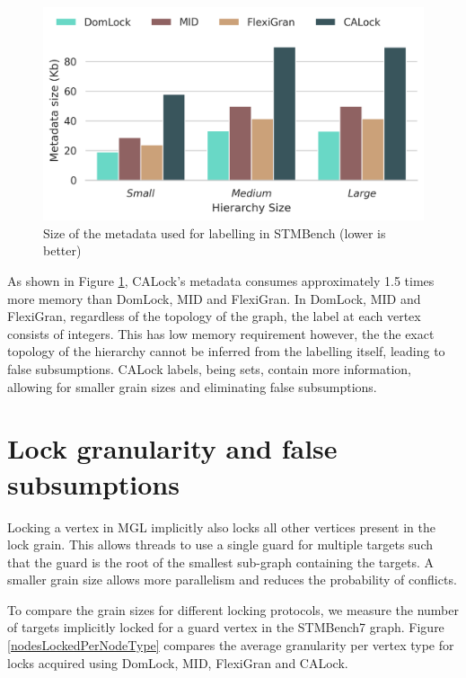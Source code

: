 \begin{figure}[h]
	\centering
	\captionsetup{justification=centering}
	\includegraphics[width=.7\columnwidth]{figures/PerformanceCharts/LabelsMemorySize.png}
 	\caption{Size of the metadata used for labelling in STMBench (lower is better)}
	\label{metadataSize}
\end{figure}

As shown in Figure \ref{metadataSize}, CALock's metadata consumes approximately 1.5 times more memory than DomLock, MID and FlexiGran.
In DomLock, MID and FlexiGran, regardless of the topology of the graph, the label at each vertex consists of integers.
This has low memory requirement however, the the exact topology of the hierarchy cannot be inferred from the labelling itself, leading to false subsumptions.
CALock labels, being sets, contain more information, allowing for smaller grain sizes and eliminating false subsumptions.



\section{Lock granularity and false subsumptions}\label{benchmark:falseSubsumption}

Locking a vertex in MGL implicitly also locks all other vertices present in the lock grain. This allows threads to use a single guard for multiple targets such that the guard is the root of the smallest sub-graph containing the targets. A smaller grain size allows more parallelism and reduces the probability of conflicts. 

To compare the grain sizes for different locking protocols, we measure the number of targets implicitly locked for a guard vertex in the STMBench7 graph. 
Figure \ref{nodesLockedPerNodeType} compares the average granularity per vertex type for locks acquired using DomLock, MID, FlexiGran and CALock.

